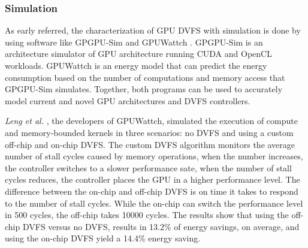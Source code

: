

\subsubsection{Simulation}

As early referred, the characterization of GPU DVFS with simulation is done by using software like GPGPU-Sim \cite{noauthor_gpgpu-sim/gpgpu-sim_distribution_2019} and GPUWattch \cite{noauthor_gpu_nodate} \cite{leng_gpuwattch:_2013}. GPGPU-Sim is an architecture simulator of GPU architecture running CUDA and OpenCL workloads. GPUWattch is an energy model that can predict the energy consumption based on the number of computations and memory access that GPGPU-Sim simulates. Together, both programs can be used to accurately model current and novel GPU architectures and DVFS controllers.

\textit{Leng et al.} \cite{leng_gpuwattch:_2013}, the developers of GPUWattch, simulated the execution of compute and memory-bounded kernels in three scenarios: no DVFS and using a custom off-chip and on-chip DVFS. The custom DVFS algorithm monitors the average number of stall cycles caused by memory operations, when the number increases, the controller switches to a slower performance sate, when the number of stall cycles reduces, the controller places the GPU in a higher performance level. The difference between the on-chip and off-chip DVFS is on time it takes to respond to the number of stall cycles. While the on-chip can switch the performance level in 500 cycles, the off-chip takes 10000 cycles. The results show that using the off-chip DVFS versus no DVFS, results in 13.2\% of energy savings, on average, and using the on-chip DVFS yield a 14.4\% energy saving.

